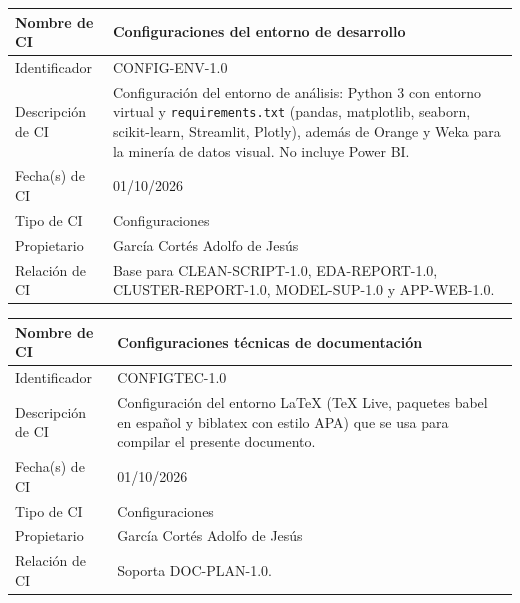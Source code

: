 \documentclass[letterpaper,11pt]{article}
\begin{document}
\noindent\begin{minipage}{\textwidth}
\small\renewcommand{\arraystretch}{1.9}
\begin{tabularx}{\textwidth}{|p{3.3cm}|Y|}
\hline
Nombre de CI & Configuraciones del entorno de desarrollo \\ \hline
Identificador & CONFIG-ENV-1.0 \\ \hline
Descripción de CI & Configuración del entorno de análisis: Python 3 con entorno virtual y \texttt{requirements.txt} (pandas, matplotlib, seaborn, scikit-learn, Streamlit, Plotly), además de Orange y Weka para la minería de datos visual. No incluye Power BI. \\ \hline
Fecha(s) de CI & 01/10/2026 \\ \hline
Tipo de CI & Configuraciones \\ \hline
Propietario & García Cortés Adolfo de Jesús \\ \hline
Relación de CI & Base para CLEAN-SCRIPT-1.0, EDA-REPORT-1.0, CLUSTER-REPORT-1.0, MODEL-SUP-1.0 y APP-WEB-1.0. \\ \hline
\end{tabularx}
\end{minipage}\par\bigskip
\noindent\begin{minipage}{\textwidth}
\small\renewcommand{\arraystretch}{1.9}
\begin{tabularx}{\textwidth}{|p{3.3cm}|Y|}
\hline
Nombre de CI & Configuraciones técnicas de documentación \\ \hline
Identificador & CONFIGTEC-1.0 \\ \hline
Descripción de CI & Configuración del entorno LaTeX (TeX Live, paquetes babel en español y biblatex con estilo APA) que se usa para compilar el presente documento. \\ \hline
Fecha(s) de CI & 01/10/2026 \\ \hline
Tipo de CI & Configuraciones \\ \hline
Propietario & García Cortés Adolfo de Jesús \\ \hline
Relación de CI & Soporta DOC-PLAN-1.0. \\ \hline
\end{tabularx}
\end{minipage}\par\bigskip
\end{document}
